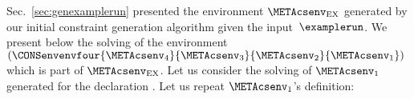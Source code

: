 \documentclass{jfp1}
\newcommand{\sizeintablesp}{footnotesize}
\begin{document}
%
%
%
Sec.~\ref{sec:genexamplerun} presented the environment
$\METAcsenv_{\mathrm{EX}}$ generated by our initial constraint generation
algorithm given the input~$\examplerun$.
%
%
We present below the solving of the environment
$(\CONSenvenvfour
{\METAcsenv_4}
{\METAcsenv_3}
{\METAcsenv_2}
{\METAcsenv_1})$
which is part of $\METAcsenv_{\mathrm{EX}}$.
%
Let us consider the solving of $\METAcsenv_1$
generated for the declaration
.
%
Let us repeat $\METAcsenv_1$'s definition:
\end{document}
